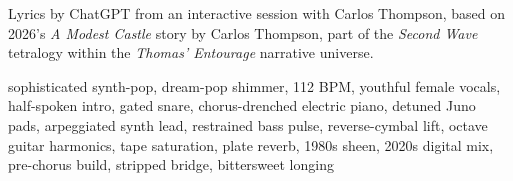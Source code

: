 
\begin{notes}
Lyrics by ChatGPT from an interactive session with Carlos Thompson, %
based on 2026's \emph{A Modest Castle} story by Carlos Thompson, %
part of the \emph{Second Wave} tetralogy within the \emph{Thomas’ Entourage} narrative universe.
\end{notes}
\begin{style}
sophisticated synth-pop, dream-pop shimmer, 112 BPM, youthful female vocals, half-spoken intro, gated snare, chorus-drenched electric piano, detuned Juno pads, arpeggiated synth lead, restrained bass pulse, reverse-cymbal lift, octave guitar harmonics, tape saturation, plate reverb, 1980s sheen, 2020s digital mix, pre-chorus build, stripped bridge, bittersweet longing
\end{style}
